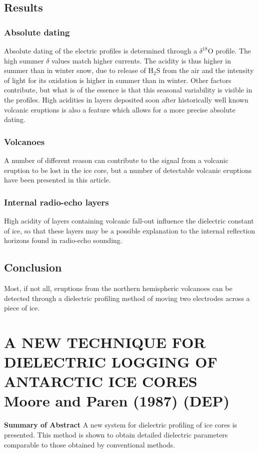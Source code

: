 \documentclass[11pt]{article}
\begin{document}
\subsection{Results}
\subsubsection{Absolute dating}
Absolute dating of the electric profiles is determined through a $\delta^{18}\text{O}$ profile. The high summer $\delta$ values match higher currents. The acidity is thus higher in summer than in winter snow, due to release of $\text{H}_2 \text{S}$ from the air and the intensity of light for its oxidation is higher in summer than in winter. Other factors contribute, but what is of the essence is that this seasonal variability is visible in the profiles.
High acidities in layers deposited soon after historically well known volcanic eruptions is also a feature which allows for a more precise absolute dating.
\subsubsection{Volcanoes}
A number of different reason can contribute to the signal from a volcanic eruption to be lost in the ice core, but a number of detectable volcanic eruptions have been presented in this article.
\subsubsection{Internal radio-echo layers}
High acidity of layers containing volcanic fall-out influence the dielectric constant of ice, so that these layers may be a possible explanation to the internal reflection horizons found in radio-echo sounding.
\subsection{Conclusion}
Most, if not all, eruptions from the northern hemispheric volcanoes can be detected through a dielectric profiling method of moving two electrodes across a piece of ice.


\section{A NEW TECHNIQUE FOR DIELECTRIC LOGGING OF ANTARCTIC ICE CORES \\ Moore and Paren (1987) (DEP)}
\textbf{Summary of Abstract} A new system for dielectric profiling of ice cores is presented. This method is shown to obtain detailed dielectric parameters comparable to those obtained by conventional methods.
\end{document}
